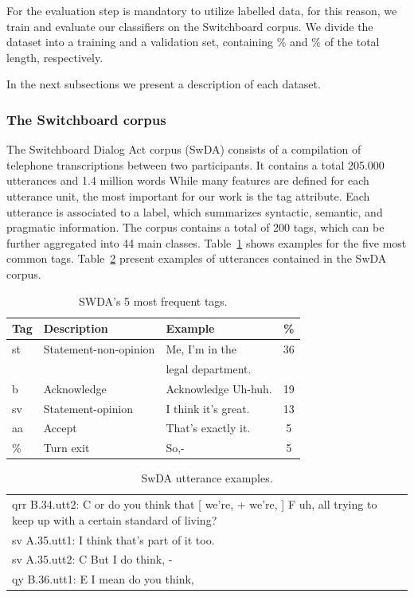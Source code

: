 For the evaluation step is mandatory to utilize labelled data, for this reason, we train and evaluate our classifiers on the Switchboard corpus. We divide the dataset into a training and a validation set, containing $\%$ and $\%$ of the total length, respectively. 

In the next subsections we present a description of each dataset.

\subsubsection*{The Switchboard corpus}
The Switchboard Dialog Act corpus (SwDA) consists of a compilation of telephone transcriptions between two participants. It contains a total 205.000 utterances and 1.4 million words
While many features are defined for each utterance unit, the most important for our work is the tag attribute. Each utterance is associated to a label, which summarizes syntactic, semantic, and pragmatic information. The corpus contains a total of 200 tags, which can be further aggregated into 44 main classes. Table~\ref{tab:swda_tag_example} shows examples for the five most common tags. Table~\ref{tab:swda_sent_example} present examples of utterances contained in the SwDA corpus.


\begin{table}[h]
\centering
\begin{tabular}{l l l c}
\hline
\textbf{Tag} & \textbf{Description} & \textbf{Example} & \textbf{\%}\\
\hline
st & Statement-non-opinion & Me, I'm in the & 36 \\
 & & legal department. & \\
b & Acknowledge & Acknowledge Uh-huh. & 19 \\
sv & Statement-opinion & I think it's great. & 13 \\
aa & Accept & That's exactly it. & 5 \\
\% & Turn exit & So,- & 5 \\
 \hline
\end{tabular}
\caption{SWDA's 5 most frequent tags.}
\label{tab:swda_tag_example}
\end{table}

\begin{table}[h]
\centering
\begin{tabular}{p{}}
\hline
qrr B.34.utt2: {C or } do you think that [ we're, + we're, ] {F uh, } all trying to keep up with a certain standard of living? \\
sv A.35.utt1: I think that's part of it too. \\
sv A.35.utt2: {C But } I do think, - \\
qy B.36.utt1: {E I mean } do you think, \\
\hline
\end{tabular}
\caption{SwDA utterance examples.}
\label{tab:swda_sent_example}
\end{table}

